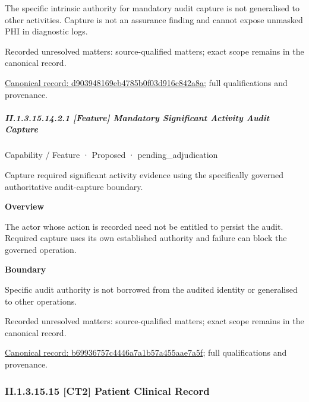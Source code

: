 The specific intrinsic authority for mandatory audit capture is not generalised to other activities. Capture is not an assurance finding and cannot expose unmasked PHI in diagnostic logs.


{\small Recorded unresolved matters: source-qualified matters; exact scope remains in the canonical record.}\par
{\footnotesize \href{../../../../continuum/strategy/capability/d903948169eb4785b0f03d916c842a8a.md}{Canonical record: d903948169eb4785b0f03d916c842a8a}; full qualifications and provenance.}\par
\subparagraph*{II.1.3.15.14.2.1 [Feature] Mandatory Significant Activity Audit Capture}
\label{navigation:II.1.3.15.14.2.1}

\label{element:b69936757c4446a7a1b57a455aae7a5f}
{\small Capability / Feature · Proposed · pending\_adjudication}\par

Capture required significant activity evidence using the specifically governed authoritative audit-capture boundary.



\textbf{Overview}



The actor whose action is recorded need not be entitled to persist the audit. Required capture uses its own established authority and failure can block the governed operation.



\textbf{Boundary}



Specific audit authority is not borrowed from the audited identity or generalised to other operations.


{\small Recorded unresolved matters: source-qualified matters; exact scope remains in the canonical record.}\par
{\footnotesize \href{../../../../continuum/strategy/capability/feature/b69936757c4446a7a1b57a455aae7a5f.md}{Canonical record: b69936757c4446a7a1b57a455aae7a5f}; full qualifications and provenance.}\par
\subsubsection*{II.1.3.15.15 [CT2] Patient Clinical Record}
\label{navigation:II.1.3.15.15}

